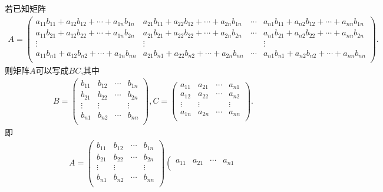 \documentclass[lang=cn,newtx,10pt,scheme=chinese]{elegantbook}
\begin{document}
\begin{proposition}\label{proposition:可以写成两个矩阵(向量)乘积的矩阵}
若已知矩阵\begin{align*}
A=\left( \begin{matrix}
a_{11}b_{11}+a_{12}b_{12}+\cdots +a_{1n}b_{1n}&		a_{21}b_{11}+a_{22}b_{12}+\cdots +a_{2n}b_{1n}&		\cdots&		a_{n1}b_{11}+a_{n2}b_{12}+\cdots +a_{nn}b_{1n}\\
a_{11}b_{21}+a_{12}b_{22}+\cdots +a_{1n}b_{2n}&		a_{21}b_{21}+a_{22}b_{22}+\cdots +a_{2n}b_{2n}&		\cdots&		a_{n1}b_{21}+a_{n2}b_{22}+\cdots +a_{nn}b_{2n}\\
\vdots&		\vdots&		&		\vdots\\
a_{11}b_{n1}+a_{12}b_{n2}+\cdots +a_{1n}b_{nn}&		a_{21}b_{n1}+a_{22}b_{n2}+\cdots +a_{2n}b_{nn}&		\cdots&		a_{n1}b_{n1}+a_{n2}b_{n2}+\cdots +a_{nn}b_{nn}\\
\end{matrix} \right) .
\end{align*}
则矩阵$A$可以写成$BC$,其中
\begin{align*}
B=\left( \begin{matrix}
b_{11}&		b_{12}&		\cdots&		b_{1n}\\
b_{21}&		b_{22}&		\cdots&		b_{2n}\\
\vdots&		\vdots&		&		\vdots\\
b_{n1}&		b_{n2}&		\cdots&		b_{nn}\\
\end{matrix} \right),
C=\left( \begin{matrix}
a_{11}&		a_{21}&		\cdots&		a_{n1}\\
a_{12}&		a_{22}&		\cdots&		a_{n2}\\
\vdots&		\vdots&		&		\vdots\\
a_{1n}&		a_{2n}&		\cdots&		a_{nn}\\
\end{matrix} \right) .
\end{align*}
即\begin{align*}
A=\left( \begin{matrix}
b_{11}&		b_{12}&		\cdots&		b_{1n}\\
b_{21}&		b_{22}&		\cdots&		b_{2n}\\
\vdots&		\vdots&		&		\vdots\\
b_{n1}&		b_{n2}&		\cdots&		b_{nn}\\
\end{matrix} \right) \left( \begin{matrix}
a_{11}&		a_{21}&		\cdots&		a_{n1}\\

\end{matrix}
\end{align*}
\end{proposition}
\end{document}
